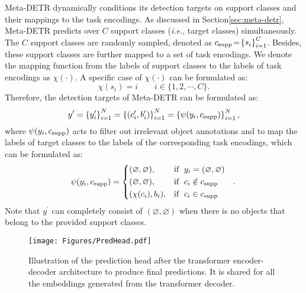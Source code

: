\documentclass[letterpaper]{article} \usepackage{aaai22}  \usepackage{times}  \usepackage{helvet}  \usepackage{courier}  \usepackage[hyphens]{url}  \usepackage{graphicx} \urlstyle{rm} \def\UrlFont{\rm}  \usepackage{natbib}  \usepackage{caption} \DeclareCaptionStyle{ruled}{labelfont=normalfont,labelsep=colon,strut=off} \frenchspacing  \setlength{\pdfpagewidth}{8.5in}  \setlength{\pdfpageheight}{11in}  \usepackage{algorithm}
\begin{document}
Meta-DETR dynamically conditions its detection targets on support classes and their mappings to the task encodings. As discussed in Section\;\ref{sec:meta-detr}, Meta-DETR predicts over $C$ support classes (\textit{i.e.}, target classes) simultaneously. The $C$ support classes are randomly sampled, denoted as $c_{\rm supp} \! = \! \left\{ s_i \right\}_{i=1}^{C}$. Besides, these support classes are further mapped to a set of task encodings. We denote the mapping function from the labels of support classes to the labels of task encodings as $\chi(\cdot)$. A specific case of $\chi(\cdot)$ can be formulated as:
\begin{equation}
\chi(s_i) = i \quad\quad i \in \{1,2, \cdots, C\}.
\end{equation}
Therefore, the detection targets of Meta-DETR can be formulated as:
\begin{equation}
y^{\prime} = \left\{ y^{\prime}_i \right\}_{i=1}^{N} = \left\{ (c^{\prime}_i, b^{\prime}_i) \right\}_{i=1}^{N} = \left\{ \psi(y_i, c_{\rm supp}) \right\}_{i=1}^{N},
\end{equation}
where $\psi(y_i, c_{\rm supp})$ acts to filter out irrelevant object annotations and to map the labels of target classes to the labels of the corresponding task encodings, which can be formulated as:
\begin{equation}
	\psi(y_i, c_{\rm supp})=\left\{
		\begin{aligned}
		&(\varnothing, \varnothing),& {\rm if}& \; \; y_i = (\varnothing, \varnothing)& \\ 
		&(\varnothing, \varnothing),& {\rm if}& \; \; c_i \notin c_{\rm supp}&.\\ 
		&(\chi(c_{i}), b_i),& {\rm if}& \; \; c_i \in c_{\rm supp}& \\ 
	\end{aligned}
	\right.
\end{equation}
Note that $y^{\prime}$ can completely consist of $(\varnothing, \varnothing)$ when there is no objects that belong to the provided support classes.



\begin{figure}[t] 
\begin{center}
   \texttt{[image: Figures/PredHead.pdf]}
\end{center}
\vspace*{-3.0mm}
   \caption{Illustration of the prediction head after the transformer encoder-decoder architecture to produce final predictions. It is shared for all the embeddings generated from the transformer decoder.}
\label{fig:pred_head}
\vspace*{-1.0mm}
\end{figure}
\end{document}
